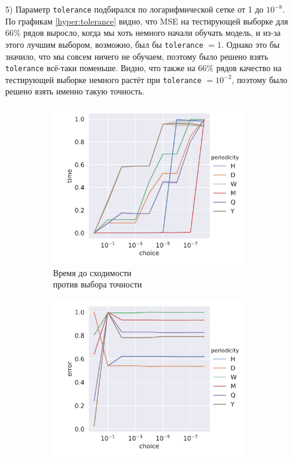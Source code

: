\documentclass[a4paper,14pt]{extarticle}
\begin{document}
\begin{enumerate}
      	\item[5)] Параметр \texttt{tolerance} подбирался по логарифмической сетке от 1 до $10^{-8}$. По графикам \ref{hyper:tolerance} видно, что MSE на тестирующей выборке для 66\% рядов выросло, когда мы хоть немного начали обучать модель, и из-за этого лучшим выбором, возможно, был бы \texttt{tolerance} $ = 1$. Однако это бы значило, что мы совсем ничего не обучаем, поэтому было решено взять \texttt{tolerance} всё-таки поменьше. Видно, что также на 66\% рядов качество на тестирующей выборке немного растёт при \texttt{tolerance} $ = 10^{-2}$, поэтому было решено взять именно такую точность. 
		\begin{figure}[!h]
			\captionsetup{justification=centering}
			\begin{subfigure}[b]{.5\linewidth}
				\centering
				\includegraphics[width=\linewidth]{pictures/hyper-tolerance-time.pdf}
				\caption{Время до сходимости \\ против выбора точности}
				\label{hyper:tolerance:time}
			\end{subfigure}%
			\begin{subfigure}[b]{.5\linewidth}
				\centering
				\includegraphics[width=\linewidth]{pictures/hyper-tolerance-mse.pdf}

\end{subfigure}
\end{figure}
\end{enumerate}
\end{document}
